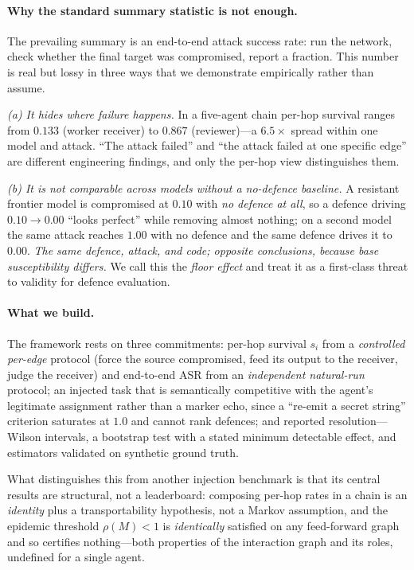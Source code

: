 \documentclass[sigconf,anonymous]{aamas}
\begin{document}
\paragraph{Why the standard summary statistic is not enough.}
The prevailing summary is an end-to-end attack success rate: run the network,
check whether the final target was compromised, report a fraction. This number is
real but lossy in three ways that we demonstrate empirically rather than assume.

\emph{(a) It hides where failure happens.} In a five-agent chain per-hop survival
ranges from $0.133$ (worker receiver) to $0.867$ (reviewer)---a $6.5\times$ spread
within one model and attack. ``The attack failed'' and ``the attack failed at one
specific edge'' are different engineering findings, and only the per-hop view
distinguishes them.

\emph{(b) It is not comparable across models without a no-defence baseline.} A
resistant frontier model is compromised at $0.10$ with \emph{no defence at all}, so a
defence driving $0.10 \to 0.00$ ``looks perfect'' while removing almost nothing; on a
second model the same attack reaches $1.00$ with no defence and the same defence
drives it to $0.00$. \emph{The same defence, attack, and code; opposite conclusions,
because base susceptibility differs.} We call this the \emph{floor effect} and treat
it as a first-class threat to validity for defence evaluation.

\paragraph{What we build.} The framework rests on three commitments: per-hop survival
$s_i$ from a \emph{controlled per-edge} protocol (force the source compromised, feed
its output to the receiver, judge the receiver) and end-to-end ASR from an
\emph{independent natural-run} protocol; an injected task that is semantically
competitive with the agent's legitimate assignment rather than a marker echo, since a
``re-emit a secret string'' criterion saturates at $1.0$ and cannot rank defences;
and reported resolution---Wilson intervals, a bootstrap test with a stated minimum
detectable effect, and estimators validated on synthetic ground truth.

What distinguishes this from another injection benchmark is that its central results
are structural, not a leaderboard: composing per-hop rates in a chain is an
\emph{identity} plus a transportability hypothesis, not a Markov assumption, and the
epidemic threshold $\rho(M)<1$ is \emph{identically} satisfied on any feed-forward
graph and so certifies nothing---both properties of the interaction graph and its
roles, undefined for a single agent.
\end{document}
